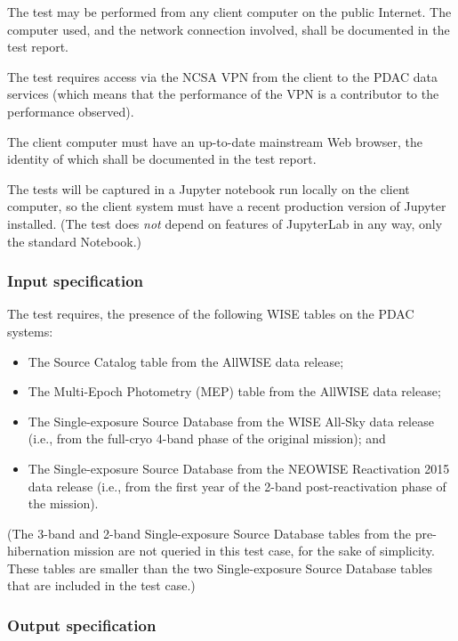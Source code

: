 The test may be performed from any client computer on the public Internet.
The computer used, and the network connection involved, shall be documented in the test report.

The test requires access via the NCSA VPN from the client to the PDAC data services 
(which means that the performance of the VPN is a contributor to the performance observed).

The client computer must have an up-to-date mainstream Web browser, the identity of which shall be documented in the test report.

The tests will be captured in a Jupyter notebook run locally on the client computer, so the client system must have a recent production version of Jupyter installed.
(The test does \emph{not} depend on features of JupyterLab in any way, only the standard Notebook.)


\subsubsection{Input specification}

The test requires, the presence of the following WISE tables on the PDAC systems:

\begin{itemize}

  \item{The Source Catalog table from the AllWISE data release;}
  \item{The Multi-Epoch Photometry (MEP) table from the AllWISE data release;}
  \item{The Single-exposure Source Database from the WISE All-Sky data release (i.e., from the full-cryo 4-band phase of the original mission); and}
  \item{The Single-exposure Source Database from the NEOWISE Reactivation 2015 data release (i.e., from the first year of the 2-band post-reactivation phase of the mission).}
\end{itemize}

(The 3-band and 2-band Single-exposure Source Database tables from the pre-hibernation mission are not queried in this test case, for the sake of simplicity.
These tables are smaller than the two Single-exposure Source Database tables that are included in the test case.)

\subsubsection{Output specification}


